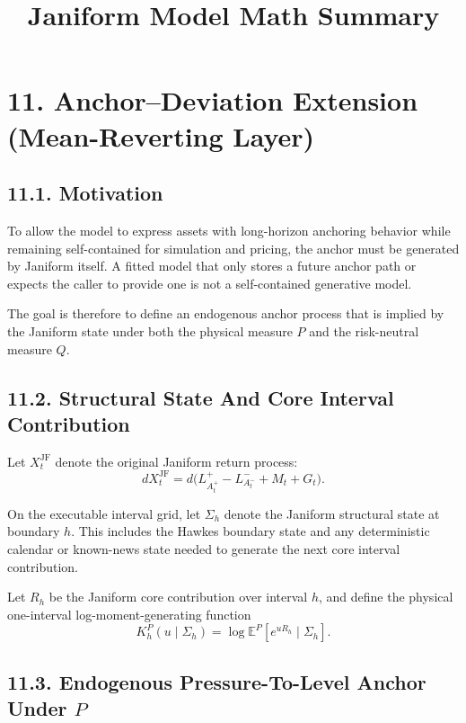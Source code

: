 \documentclass[11pt]{article}
\title{Janiform Model Math Summary}
\author{}
\date{}
\begin{document}
    \maketitle

    \section*{11. Anchor–Deviation Extension (Mean-Reverting Layer)}

    \subsection*{11.1. Motivation}
    To allow the model to express assets with long-horizon anchoring behavior
    while remaining self-contained for simulation and pricing, the anchor must
    be generated by Janiform itself. A fitted model that only stores a future
    anchor path or expects the caller to provide one is not a self-contained
    generative model.

    The goal is therefore to define an endogenous anchor process that is implied
    by the Janiform state under both the physical measure \(P\) and the
    risk-neutral measure \(Q\).

    \subsection*{11.2. Structural State And Core Interval Contribution}

    Let \(X_t^{\mathrm{JF}}\) denote the original Janiform return process:
    \[
        dX_t^{\mathrm{JF}} = d\big(L^+_{A_t^+} - L^-_{A_t^-} + M_t + G_t\big).
    \]

    On the executable interval grid, let \(\Sigma_h\) denote the Janiform
    structural state at boundary \(h\). This includes the Hawkes boundary state
    and any deterministic calendar or known-news state needed to generate the
    next core interval contribution.

    Let \(R_h\) be the Janiform core contribution over interval \(h\), and define
    the physical one-interval log-moment-generating function
    \[
        K_h^P(u \mid \Sigma_h)
        =
        \log \mathbb E^P[e^{u R_h}\mid \Sigma_h].
    \]

    \subsection*{11.3. Endogenous Pressure-To-Level Anchor Under \(P\)}
\end{document}
